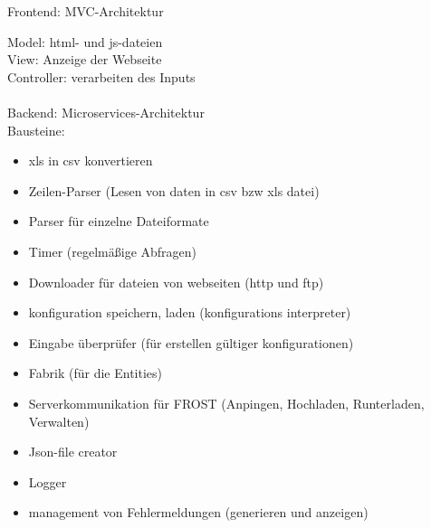 Frontend: MVC-Architektur

Model: html- und js-dateien\\
View: Anzeige der Webseite\\
Controller: verarbeiten des Inputs\\
\ \\
Backend: Microservices-Architektur
\ \\

Bausteine:
\begin{itemize}
\item xls in csv konvertieren
\item Zeilen-Parser (Lesen von daten in csv bzw xls datei)
\item Parser für einzelne Dateiformate
\item Timer (regelmäßige Abfragen)
\item Downloader für dateien von webseiten (http und ftp)
\item konfiguration speichern, laden (konfigurations interpreter)
\item Eingabe überprüfer (für erstellen gültiger konfigurationen)
\item Fabrik (für die Entities)
\item Serverkommunikation für FROST (Anpingen, Hochladen, Runterladen, Verwalten)
\item Json-file creator
\item Logger
\item management von Fehlermeldungen (generieren und anzeigen)

\end{itemize}